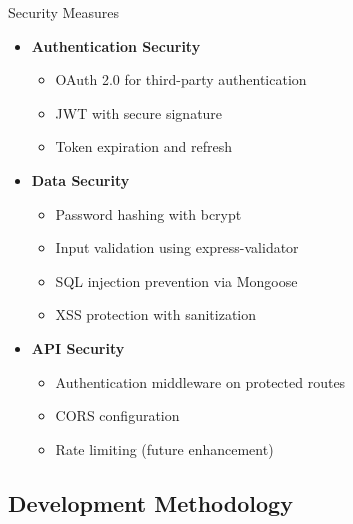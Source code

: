 \begin{frame}{Security Measures}
\begin{itemize}
    \item \textbf{Authentication Security}
    \begin{itemize}
        \item OAuth 2.0 for third-party authentication
        \item JWT with secure signature
        \item Token expiration and refresh
    \end{itemize}
    
    \item \textbf{Data Security}
    \begin{itemize}
        \item Password hashing with bcrypt
        \item Input validation using express-validator
        \item SQL injection prevention via Mongoose
        \item XSS protection with sanitization
    \end{itemize}
    
    \item \textbf{API Security}
    \begin{itemize}
        \item Authentication middleware on protected routes
        \item CORS configuration
        \item Rate limiting (future enhancement)
    \end{itemize}
\end{itemize}
\end{frame}

\subsection{Development Methodology}

